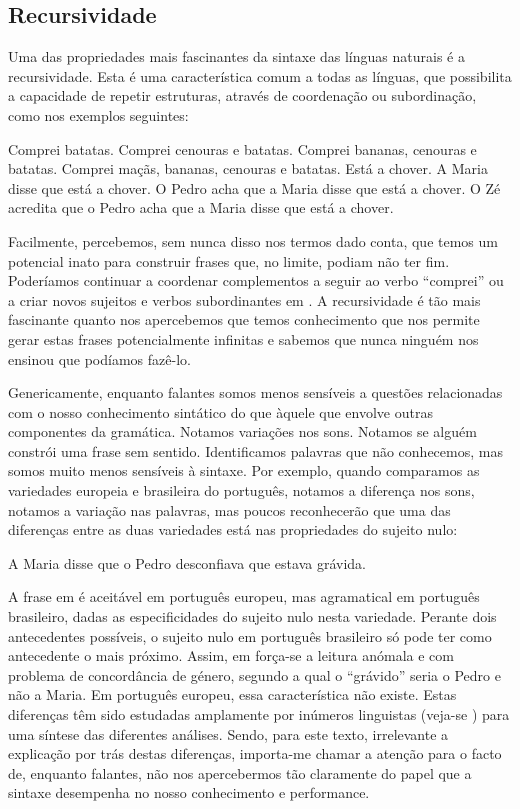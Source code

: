 \documentclass[output=paper,colorlinks,citecolor=brown,booklanguage=portuguese]{langscibook}
\begin{document}
\subsection{Recursividade}

Uma das propriedades mais fascinantes da sintaxe das línguas naturais é a recursividade. Esta é uma característica comum a todas as línguas, que possibilita a capacidade de repetir estruturas, através de coordenação ou subordinação, como nos exemplos seguintes:

\ea\label{ex:cap2ex7}
    \ea Comprei batatas.
    \ex Comprei cenouras e batatas.
    \ex Comprei bananas, cenouras e batatas.
    \ex Comprei maçãs, bananas, cenouras e batatas.
    \z
\z
\ea\label{ex:cap2ex8}
    \ea Está a chover.
    \ex A Maria disse que está a chover.
    \ex O Pedro acha que a Maria disse que está a chover.
    \ex O Zé acredita que o Pedro acha que a Maria disse que está a chover.
\z
\z

Facilmente, percebemos, sem nunca disso nos termos dado conta, que temos um potencial inato para construir frases que, no limite, podiam não ter fim. Poderíamos continuar a coordenar complementos a seguir ao verbo “comprei” ou a criar novos sujeitos e verbos subordinantes em . A recursividade é tão mais fascinante quanto nos apercebemos que temos conhecimento que nos permite gerar estas frases potencialmente infinitas e sabemos que nunca ninguém nos ensinou que podíamos fazê-lo.

Genericamente, enquanto falantes somos menos sensíveis a questões relacionadas com o nosso conhecimento sintático do que àquele que envolve outras componentes da gramática. Notamos variações nos sons. Notamos se alguém constrói uma frase sem sentido. Identificamos palavras que não conhecemos, mas somos muito menos sensíveis à sintaxe. Por exemplo, quando comparamos as variedades europeia e brasileira do português, notamos a diferença nos sons, notamos a variação nas palavras, mas poucos reconhecerão que uma das diferenças entre as duas variedades está nas propriedades do sujeito nulo:

\ea\label{ex:cap2ex9} A Maria disse que o Pedro desconfiava que estava grávida.
\z

A frase em  é aceitável em português europeu, mas agramatical em português brasileiro, dadas as especificidades do sujeito nulo nesta variedade. Perante dois antecedentes possíveis, o sujeito nulo em português brasileiro só pode ter como antecedente o mais próximo. Assim, em  força-se a leitura anómala e com problema de concordância de género, segundo a qual o “grávido” seria o Pedro e não a Maria. Em português europeu, essa característica não existe. Estas diferenças têm sido estudadas amplamente por inúmeros linguistas (veja-se \citealt{Rodrigues2004}) para uma síntese das diferentes análises. Sendo, para este texto, irrelevante a explicação por trás destas diferenças, importa-me chamar a atenção para o facto de, enquanto falantes, não nos apercebermos tão claramente do papel que a sintaxe desempenha no nosso conhecimento e performance.
\end{document}

